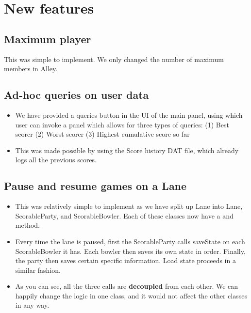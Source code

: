 
\section{New features}

\subsection{Maximum player}

This was simple to implement. We only changed the number of maximum members in Alley.

\subsection{Ad-hoc queries on user data}

\begin{itemize}
\item We have provided a queries button in the UI of the main panel, using which user can invoke a panel which allows for three types of queries: (1) Best scorer (2) Worst scorer (3) Highest cumulative score so far
\item This was made possible by using the Score history DAT file, which already logs all the previous scores.
\end{itemize}


\subsection{Pause and resume games on a Lane}

\begin{itemize}
\item This was relatively simple to implement as we have split up Lane into Lane, ScorableParty, and ScorableBowler. Each of these classes now have a  and  method.
\item Every time the lane is paused, first the ScorableParty calls saveState on each ScorableBowler it has. Each bowler then saves its own state in order. Finally, the party then saves certain specific information. Load state proceeds in a similar fashion.
\item As you can see, all the three  calls are \textbf{decoupled} from each other. We can happily change the logic in one class, and it would not affect the other classes in any way.
\end{itemize}
